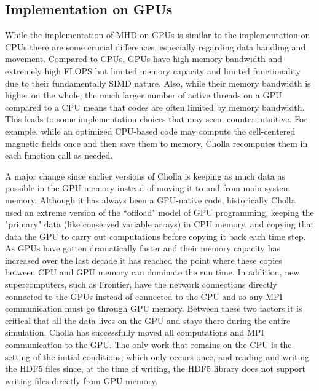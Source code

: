 \subsection{Implementation on GPUs}
\label{sec:gpu-vs-cpu}

While the implementation of MHD on GPUs is similar to the implementation on CPUs there are some crucial differences, especially regarding data handling and movement. Compared to CPUs, GPUs have high memory bandwidth and extremely high FLOPS but limited memory capacity and limited functionality due to their fundamentally SIMD nature. Also, while their memory bandwidth is higher on the whole, the much larger number of active threads on a GPU compared to a CPU means that codes are often limited by memory bandwidth. This leads to some implementation choices that may seem counter-intuitive. For example, while an optimized CPU-based code may compute the cell-centered magnetic fields once and then save them to memory, Cholla recomputes them in each function call as needed.

A major change since earlier versions of Cholla is keeping as much data as possible in the GPU memory instead of moving it to and from main system memory. Although it has always been a GPU-native code, historically Cholla used an extreme version of the ``offload" model of GPU programming, keeping the "primary" data (like conserved variable arrays) in CPU memory, and copying that data the GPU to carry out computations before copying it back each time step. As GPUs have gotten dramatically faster and their memory capacity has increased over the last decade it has reached the point where these copies between CPU and GPU memory can dominate the run time. In addition, new supercomputers, such as Frontier, have the network connections directly connected to the GPUs instead of connected to the CPU and so any MPI communication must go through GPU memory. Between these two factors it is critical that all the data lives on the GPU and stays there during the entire simulation. Cholla has successfully moved all computations and MPI communication to the GPU. The only work that remains on the CPU is the setting of the initial conditions, which only occurs once, and reading and writing the HDF5 files since, at the time of writing, the HDF5 library does not support writing files directly from GPU memory.


